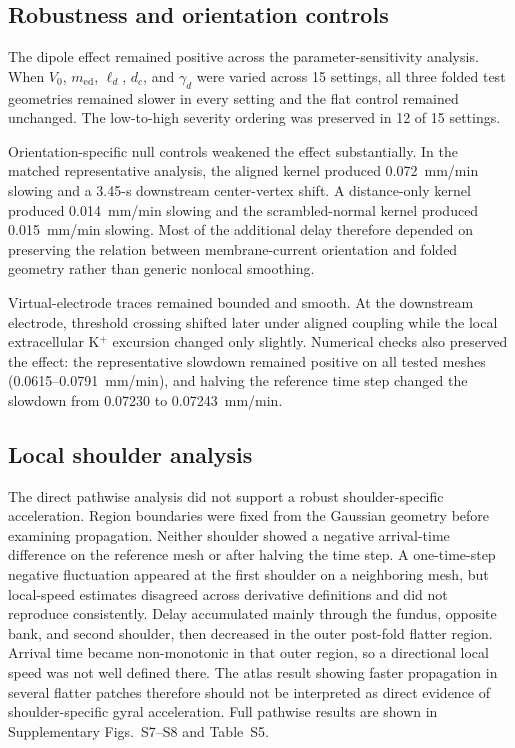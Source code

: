 \documentclass[12pt]{article}
\begin{document}
\subsection{Robustness and orientation controls}

The dipole effect remained positive across the parameter-sensitivity analysis. When $V_0$, $m_{\mathrm{ed}}$, $\ell_d$, $d_c$, and $\gamma_d$ were varied across 15 settings, all three folded test geometries remained slower in every setting and the flat control remained unchanged. The low-to-high severity ordering was preserved in 12 of 15 settings.

Orientation-specific null controls weakened the effect substantially. In the matched representative analysis, the aligned kernel produced 0.072~mm/min slowing and a 3.45-s downstream center-vertex shift. A distance-only kernel produced 0.014~mm/min slowing and the scrambled-normal kernel produced 0.015~mm/min slowing. Most of the additional delay therefore depended on preserving the relation between membrane-current orientation and folded geometry rather than generic nonlocal smoothing.

Virtual-electrode traces remained bounded and smooth. At the downstream electrode, threshold crossing shifted later under aligned coupling while the local extracellular K$^+$ excursion changed only slightly. Numerical checks also preserved the effect: the representative slowdown remained positive on all tested meshes (0.0615--0.0791~mm/min), and halving the reference time step changed the slowdown from 0.07230 to 0.07243~mm/min.

\subsection{Local shoulder analysis}

The direct pathwise analysis did not support a robust shoulder-specific acceleration. Region boundaries were fixed from the Gaussian geometry before examining propagation. Neither shoulder showed a negative arrival-time difference on the reference mesh or after halving the time step. A one-time-step negative fluctuation appeared at the first shoulder on a neighboring mesh, but local-speed estimates disagreed across derivative definitions and did not reproduce consistently. Delay accumulated mainly through the fundus, opposite bank, and second shoulder, then decreased in the outer post-fold flatter region. Arrival time became non-monotonic in that outer region, so a directional local speed was not well defined there. The atlas result showing faster propagation in several flatter patches therefore should not be interpreted as direct evidence of shoulder-specific gyral acceleration. Full pathwise results are shown in Supplementary Figs.~S7--S8 and Table~S5.
\end{document}
